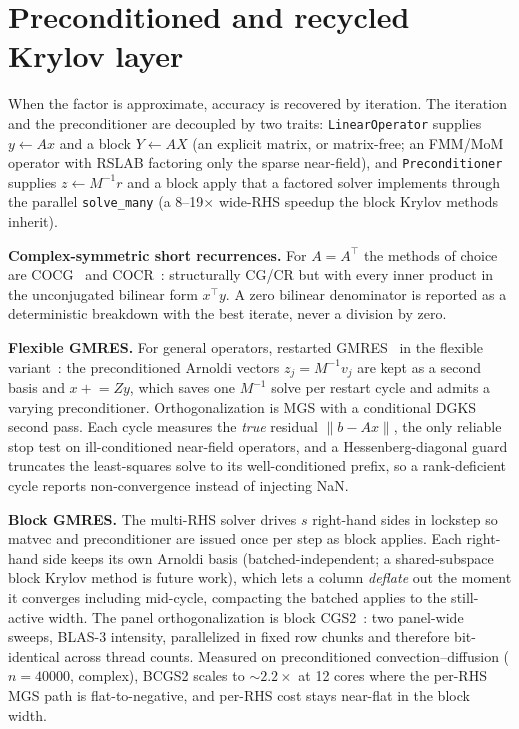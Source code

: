 \documentclass[11pt,a4paper]{article}
\newcommand{\rT}{\textsf{RSLAB}}
\newcommand{\code}[1]{\texttt{\small #1}}
\begin{document}
\section{Preconditioned and recycled Krylov layer}
\label{sec:iterative}
When the factor is approximate, accuracy is recovered by iteration. The iteration and
the preconditioner are decoupled by two traits: \code{LinearOperator} supplies
$y\leftarrow Ax$ and a block $Y\leftarrow AX$ (an explicit matrix, or matrix-free;
an FMM/MoM operator with \rT{} factoring only the sparse near-field), and
\code{Preconditioner} supplies $z\leftarrow M^{-1}r$ and a block apply that a factored
solver implements through the parallel \code{solve\_many} (a
\numrange{8}{19}$\times$ wide-RHS speedup the block Krylov methods inherit).

\textbf{Complex-symmetric short recurrences.} For $A=A^{\!\top}$ the methods of choice
are COCG~\cite{cocg} and COCR~\cite{cocr}: structurally CG/CR but with every inner
product in the unconjugated bilinear form $x^{\!\top}y$. A zero bilinear denominator is
reported as a deterministic breakdown with the best iterate, never a division by zero.

\textbf{Flexible GMRES.} For general operators, restarted GMRES~\cite{saadschultz} in
the flexible variant~\cite{fgmres}: the preconditioned Arnoldi vectors $z_j=M^{-1}v_j$
are kept as a second basis and $x\mathrel{+}=Zy$, which saves one $M^{-1}$ solve per
restart cycle and admits a varying preconditioner. Orthogonalization is MGS with a
conditional DGKS~\cite{dgks} second pass. Each cycle measures the \emph{true} residual
$\|b-Ax\|$, the only reliable stop test on ill-conditioned near-field operators,
and a Hessenberg-diagonal guard truncates the least-squares solve to its
well-conditioned prefix, so a rank-deficient cycle reports non-convergence instead of
injecting NaN.

\textbf{Block GMRES.} The multi-RHS solver drives $s$ right-hand sides in lockstep so
matvec and preconditioner are issued once per step as block applies. Each right-hand
side keeps its own Arnoldi basis (batched-independent; a shared-subspace block Krylov
method is future work), which lets a column \emph{deflate} out the moment it converges
including mid-cycle, compacting the batched applies to the still-active width. The
panel orthogonalization is block CGS2~\cite{giraud,barlow}: two panel-wide sweeps,
BLAS-3 intensity, parallelized in fixed row chunks and therefore bit-identical across
thread counts. Measured on preconditioned convection--diffusion ($n=\num{40000}$,
complex), BCGS2 scales to $\sim2.2\times$ at 12 cores where the per-RHS MGS path is
flat-to-negative, and per-RHS cost stays near-flat in the block width.
\end{document}
